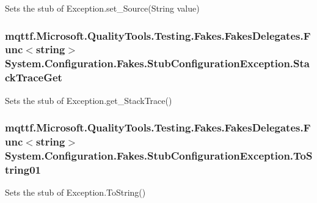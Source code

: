 Sets the stub of Exception.\-set\-\_\-\-Source(\-String value)

\hypertarget{class_system_1_1_configuration_1_1_fakes_1_1_stub_configuration_exception_aa7af811d3b9d8acf0222750a0135a2a7}{
\subsubsection[{Stack\-Trace\-Get}]{\setlength{\rightskip}{0pt plus 5cm}mqttf.\-Microsoft.\-Quality\-Tools.\-Testing.\-Fakes.\-Fakes\-Delegates.\-Func$<$string$>$ System.\-Configuration.\-Fakes.\-Stub\-Configuration\-Exception.\-Stack\-Trace\-Get}}\label{class_system_1_1_configuration_1_1_fakes_1_1_stub_configuration_exception_aa7af811d3b9d8acf0222750a0135a2a7}


Sets the stub of Exception.\-get\-\_\-\-Stack\-Trace()

\hypertarget{class_system_1_1_configuration_1_1_fakes_1_1_stub_configuration_exception_aff1a76117df9739cce5250914efd62a3}{
\subsubsection[{To\-String01}]{\setlength{\rightskip}{0pt plus 5cm}mqttf.\-Microsoft.\-Quality\-Tools.\-Testing.\-Fakes.\-Fakes\-Delegates.\-Func$<$string$>$ System.\-Configuration.\-Fakes.\-Stub\-Configuration\-Exception.\-To\-String01}}\label{class_system_1_1_configuration_1_1_fakes_1_1_stub_configuration_exception_aff1a76117df9739cce5250914efd62a3}


Sets the stub of Exception.\-To\-String()



